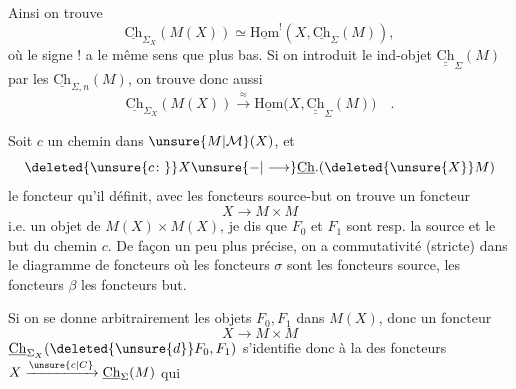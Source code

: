 Ainsi on trouve
\[
\underline{\mathrm{Ch}}_{\Sigma_X}(M(X))\simeq\underline{\mathrm{Hom}}^!(X,\underline{\mathrm{Ch}}_\Sigma(M)),
\]
où le signe $!$ a le même sens que plus bas.
Si on introduit le ind-objet $\underline{\underline{\mathrm{Ch}}}_\Sigma(M)$
 par les $\underline{\mathrm{Ch}}_{\Sigma,n}(M)$, on trouve donc
aussi
\[
\underline{\mathrm{Ch}}_{\Sigma_X}(M(X))\xrightarrow{\approx}
\underline{\mathrm{Hom}}\bigl(X,\underline{\underline{\mathrm{Ch}}}_\Sigma(M)\bigr)\quad .
\]

Soit $c$ un  chemin dans $\unsure{M|\mathcal{M}}(X)$, et
\[
  \deleted{\unsure{c\colon}} X\unsure{\mathord{-}|\longrightarrow}\underline{\mathrm{Ch}}.(\deleted{\unsure{X}}M)
\]
le foncteur qu'il définit,  avec les foncteurs source-but  on trouve un foncteur 
\[
 X\longrightarrow M\times M
\]
i.e. un objet  de $M(X)\times M(X)$,  je dis que  $F_0$ et $F_1$ sont resp. la source et le but du chemin $c$. De façon un peu plus précise, on a commutativité (stricte) dans le diagramme de foncteurs
où les foncteurs $\sigma$ sont les foncteurs source, les foncteurs $\beta$  les foncteurs but.

Si on se donne arbitrairement les objets $F_0,F_1$ dans $M(X)$, donc un foncteur
\[
 X\longrightarrow M\times M
\]
$\underline{\mathrm{Ch}}_{\Sigma_X}(\deleted{\unsure{d}}F_0,F_1)$ s'identifie donc à la   des foncteurs  $X\xrightarrow{\unsure{c|C}}\underline{\mathrm{Ch}}_\Sigma(M)$ qui \uline{}
